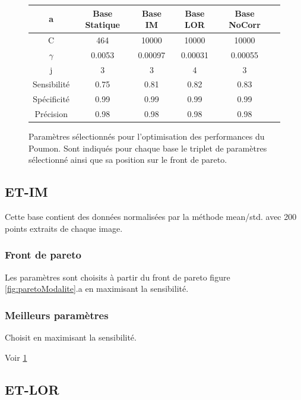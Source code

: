 \begin{figure}[h!]
\label{fig:paramsModPoumon}
		\begin{tabular}{c| c c c c c}
  \hline
  a	& Base Statique	& Base IM	& Base LOR	& Base NoCorr	\\
  \hline
 C 	& 464		& 10000		& 10000		& 10000		\\
\hline
$\gamma$& 0.0053	& 0.00097	& 0.00031	& 0.00055	\\
\hline
j	& 3		& 3		& 4		& 3		\\
\hline
\hline
Sensibilité& 0.75	& 0.81		& 0.82		& 0.83	\\
\hline
Spécificité& 0.99	& 0.99		& 0.99		& 0.99		\\
\hline
Précision& 0.98		& 0.98		& 0.98		& 0.98		\\
\hline
 		\end{tabular}

\caption{Paramètres sélectionnés pour l'optimisation des performances du Poumon. Sont indiqués pour chaque base le triplet de paramètres sélectionné ainsi que sa position sur le front de pareto.}
\end{figure}



\subsection{ET-IM}

Cette base contient des données normalisées par la méthode mean/std. avec 200 points extraits de chaque image.

\subsubsection{Front de pareto}

Les paramètres sont choisits à partir du front de pareto figure \ref{fig:paretoModalite}.a en maximisant la sensibilité.

\subsubsection{Meilleurs paramètres}

Choisit en maximisant la sensibilité.			

Voir \ref{fig:paramsModPoumon}


\subsection{ET-LOR}

